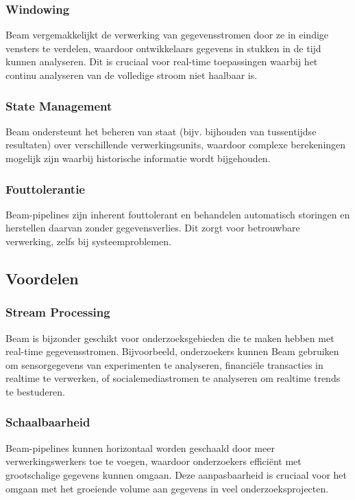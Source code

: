 \subsubsection{Windowing}
Beam vergemakkelijkt de verwerking van gegevensstromen door ze in eindige vensters te verdelen, waardoor ontwikkelaars gegevens in stukken in de tijd kunnen analyseren. Dit is cruciaal voor real-time toepassingen waarbij het continu analyseren van de volledige stroom niet haalbaar is.

\subsubsection{State Management}
Beam ondersteunt het beheren van staat (bijv. bijhouden van tussentijdse resultaten) over verschillende verwerkingsunits, waardoor complexe berekeningen mogelijk zijn waarbij historische informatie wordt bijgehouden.

\subsubsection{Fouttolerantie}
Beam-pipelines zijn inherent fouttolerant en behandelen automatisch storingen en herstellen daarvan zonder gegevensverlies. Dit zorgt voor betrouwbare verwerking, zelfs bij systeemproblemen.

\subsection{Voordelen}

\subsubsection{Stream Processing}
Beam is bijzonder geschikt voor onderzoeksgebieden die te maken hebben met real-time gegevensstromen. Bijvoorbeeld, onderzoekers kunnen Beam gebruiken om sensorgegevens van experimenten te analyseren, financiële transacties in realtime te verwerken, of socialemediastromen te analyseren om realtime trends te bestuderen.

\subsubsection{Schaalbaarheid}
Beam-pipelines kunnen horizontaal worden geschaald door meer verwerkingswerkers toe te voegen, waardoor onderzoekers efficiënt met grootschalige gegevens kunnen omgaan. Deze aanpasbaarheid is cruciaal voor het omgaan met het groeiende volume aan gegevens in veel onderzoeksprojecten.

